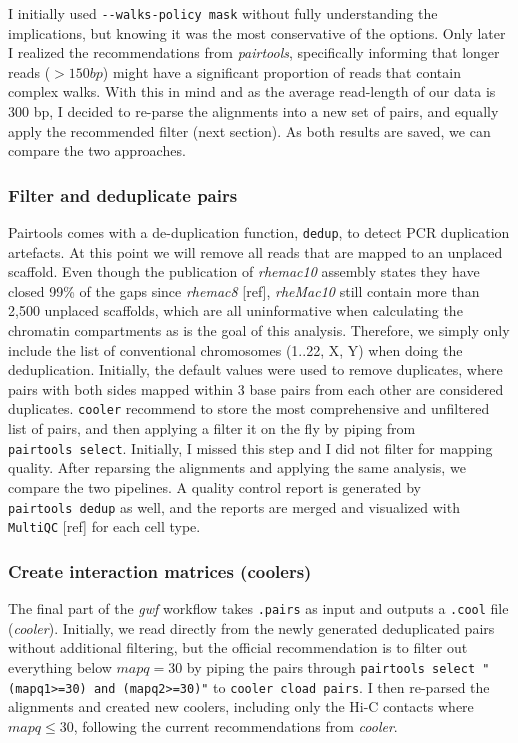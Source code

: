 \documentclass[
  11pt,
  a4paper,
]{scrbook}
\let\oldemph\emph
\renewcommand\emph[1]{\oldemph{\color{gray}#1}}
\begin{document}
\normalsize

I initially used \texttt{-\/-walks-policy\ mask} without fully
understanding the implications, but knowing it was the most conservative
of the options. Only later I realized the recommendations from
\emph{pairtools}, specifically informing that longer reads (\(>150bp\))
might have a significant proportion of reads that contain complex walks.
With this in mind and as the average read-length of our data is 300 bp,
I decided to re-parse the alignments into a new set of pairs, and
equally apply the recommended filter (next section). As both results are
saved, we can compare the two approaches.

\subsubsection{Filter and deduplicate
pairs}\label{filter-and-deduplicate-pairs}

Pairtools comes with a de-duplication function, \texttt{dedup}, to
detect PCR duplication artefacts. At this point we will remove all reads
that are mapped to an unplaced scaffold. Even though the publication of
\emph{rhemac10} assembly states they have closed 99\% of the gaps since
\emph{rhemac8} {[}ref{]}, \emph{rheMac10} still contain more than 2,500
unplaced scaffolds, which are all uninformative when calculating the
chromatin compartments as is the goal of this analysis. Therefore, we
simply only include the list of conventional chromosomes (1..22, X, Y)
when doing the deduplication. Initially, the default values were used to
remove duplicates, where pairs with both sides mapped within 3 base
pairs from each other are considered duplicates. \texttt{cooler}
recommend to store the most comprehensive and unfiltered list of pairs,
and then applying a filter it on the fly by piping from
\texttt{pairtools\ select}. Initially, I missed this step and I did not
filter for mapping quality. After reparsing the alignments and applying
the same analysis, we compare the two pipelines. A quality control
report is generated by \texttt{pairtools\ dedup} as well, and the
reports are merged and visualized with \texttt{MultiQC} {[}ref{]} for
each cell type.

\subsubsection{Create interaction matrices
(coolers)}\label{create-interaction-matrices-coolers}

The final part of the \emph{gwf} workflow takes \texttt{.pairs} as input
and outputs a \texttt{.cool} file (\emph{cooler}). Initially, we read
directly from the newly generated deduplicated pairs without additional
filtering, but the official recommendation is to filter out everything
below \(mapq = 30\) by piping the pairs through
\texttt{pairtools\ select\ "(mapq1\textgreater{}=30)\ and\ (mapq2\textgreater{}=30)"}
to \texttt{cooler\ cload\ pairs}. I then re-parsed the alignments and
created new coolers, including only the Hi-C contacts where
\(mapq \leq 30\), following the current recommendations from
\emph{cooler}.
\end{document}
